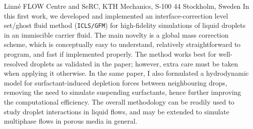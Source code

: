 %
%
%
%
%
%
%
\paperaffiliation
{%
  Linn\'e FLOW Centre and SeRC, KTH Mechanics, S-100 44 Stockholm, Sweden%
}%
%
%
%
%
%
\papernumber{}%
%
%
%
%
%
\papersummary%
{%
In this first work, we developed and implemented an interface-correction level set/ghost fluid method (\texttt{ICLS/GFM}) for high-fidelity simulations of liquid droplets in an immiscible carrier fluid. The main novelty is a global mass correction scheme, which is conceptually easy to understand, relatively straightforward to program, and fast if implemented properly. The method works best for well-resolved droplets as validated in the paper; however, extra care must be taken when applying it otherwise. In the same paper, I also formulated a hydrodynamic model for surfactant-induced depletion forces between neighbouring drops, removing the need to simulate suspending surfactants, hence further improving the computational efficiency. The overall methodology can be readily used to study droplet interactions in liquid flows, and may be extended to simulate multiphase flows in porous media in general.
}%
%
\graphicspath{{paper1/}}%
%
%
%
